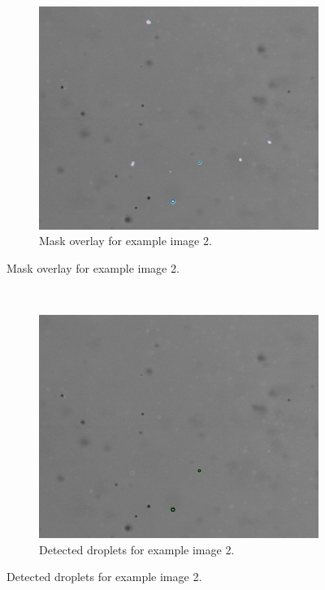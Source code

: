 ~
\vfill
~
\begin{figure}[htbp]\ContinuedFloat
    \centering
    \begin{subfigure}{\textwidth}
        \centering
            \includegraphics[width=\textwidth]{images/samples/36dbm_C001H001S0001000205_leftImg8bit_overlay.jpeg}
        \caption{Mask overlay for example image 2.}
    \end{subfigure}
\end{figure}
\vfill
~
\vfill
\begin{figure}[htbp]\ContinuedFloat
    \begin{subfigure}{\textwidth}
        \centering
            \includegraphics[width=\textwidth]{images/samples/36dbm_C001H001S0001000205_leftImg8bit_detected.jpeg}
        \caption{Detected droplets for example image 2.}
    \end{subfigure}
\end{figure}
